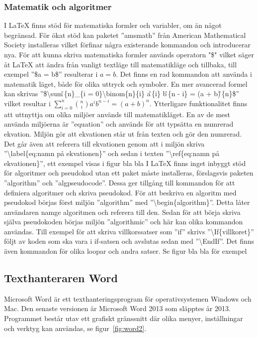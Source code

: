 \subsubsection{Matematik och algoritmer}
I {\LaTeX} finns stöd för matematiska formler och variabler, om än något begränsad. För ökat stöd kan paketet ''amsmath'' från American Mathematical Society installeras vilket förfinar några existerande kommandon och introducerar nya. För att kunna skriva matematiska formler används operatorn "\$" \hspace{0.2mm} vilket säger åt {\LaTeX} att ändra från vanligt textläge till matematikläge och tillbaka, till exempel ''\$a = b\$'' resulterar i $a = b$. Det finns en rad kommandon att använda i matematik läget, både för olika uttryck och symboler. En mer avancerad formel kan skrivas ''\$\textbackslash sum\^ \,\{n\}\_\{i = 0\}\textbackslash binom\{n\}\{i\} a\^ \,\{i\} b\^ \,\{n - i\} = (a + b)\^ \,\{n\}\$'' vilket resultar i $\sum^{n}_{i=0}\binom{n}{i}a^{i}b^{n-i} = (a + b)^{n}$. 
\newline
\newline
Ytterligare funktionalitet finns att uttnyttja om olika miljöer används till matematikläget. En av de mest använda miljöerna är ''equation'' och används för att typsätta en numrerad ekvation. Miljön gör att ekvationen står ut från texten och gör den numrerad. Det går även att referera till ekvationen genom att i miljön skriva ''\textbackslash label\{eq:namn på ekvationen\}'' och sedan i texten ''\textbackslash ref\{eq:namn på ekvationen\}'', ett exempel visas i figur bla bla        
\newline
\newline
I {\LaTeX} finns inget inbyggt stöd för algoritmer och pseudokod utan ett paket måste installeras, förslagsvis paketen ''algorithm'' och ''algpseudocode''. Dessa ger tillgång till kommandon för att definiera algoritmer och skriva pseudokod. För att beskriva en algoritm med pseudokod börjas först miljön ''algorithm'' med ''\textbackslash begin\{algorithm\}''. Detta låter användaren namge algoritmen och referera till den. Sedan för att börja skriva själva pseudokoden börjas miljön ''algorithmic'' och här kan olika kommandon användas. Till exempel för att skriva villkorssatser som ''if'' skrivs ''\textbackslash If\{villkoret\}'' följt av koden som ska vara i if-satsen och avslutas sedan med ''\textbackslash EndIf''. Det finns även kommandon för olika loopar och andra satser. Se figur bla bla för exempel 

\subsection{Texthanteraren Word}
Microsoft Word är ett texthanteringsprogram för operativsystemen Windows och Mac. Den senaste versionen är Microsoft Word 2013 som släpptes år 2013. Programmet består utav ett grafiskt gränssnitt där olika menyer, inställningar och verktyg kan användas, se figur~\ref{fig:word2}. 


